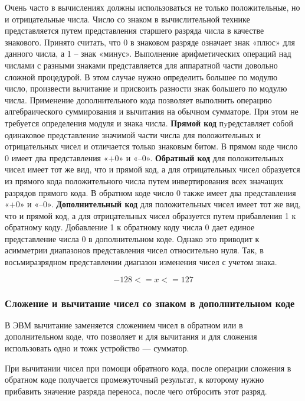 Очень часто в вычислениях должны использоваться не только положительные, но и отрицательные числа. Число со знаком в вычислительной технике представляется путем представления старшего разряда числа в качестве знакового. Принято считать, что 0 в знаковом разряде означает знак «плюс» для данного числа, а 1 – знак «минус». Выполнение арифметических операций над числами с разными знаками представляется для аппаратной части довольно сложной процедурой. В этом случае нужно определить большее по модулю число, произвести вычитание и присвоить разности знак большего по модулю числа. Применение дополнительного кода позволяет выполнить операцию алгебраического суммирования и вычитания на обычном сумматоре. При этом не требуется определения модуля и знака числа. \linebreak
\textbf{Прямой код} пyредставляет собой одинаковое представление значимой части числа для положительных и отрицательных чисел и отличается только знаковым битом. В прямом коде число 0 имеет два представления «+0» и «–0». \linebreak
\textbf{Обратный код} для положительных чисел имеет тот же вид, что и прямой код, а для отрицательных чисел образуется из прямого кода положительного числа путем инвертирования всех значащих разрядов прямого кода. В обратном коде число 0 также имеет два представления «+0» и «–0». \linebreak
\textbf{Дополнительный код} для положительных чисел имеет тот же вид, что и прямой код, а для отрицательных чисел образуется путем прибавления 1 к обратному коду. Добавление 1 к обратному коду числа 0 дает единое представление числа 0 в дополнительном коде. Однако это приводит к асимметрии диапазонов представления чисел относительно нуля. Так, в восьмиразрядном представлении диапазон изменения чисел с учетом знака. \linebreak

\[-128 <= x <= 127\]

\subsubsection{Сложение и вычитание чисел со знаком в дополнительном коде}

В ЭВМ вычитание заменяется сложением чисел в обратном или в дополнительном коде, что позволяет и для вычитания и для сложения использовать одно и тожк устройство --- сумматор.

При вычитании чисел при помощи обратного кода, после операции сложения в обратном коде получается промежуточный результат, к которому нужно прибавить значение разряда переноса, после чего отбросить этот разряд.

